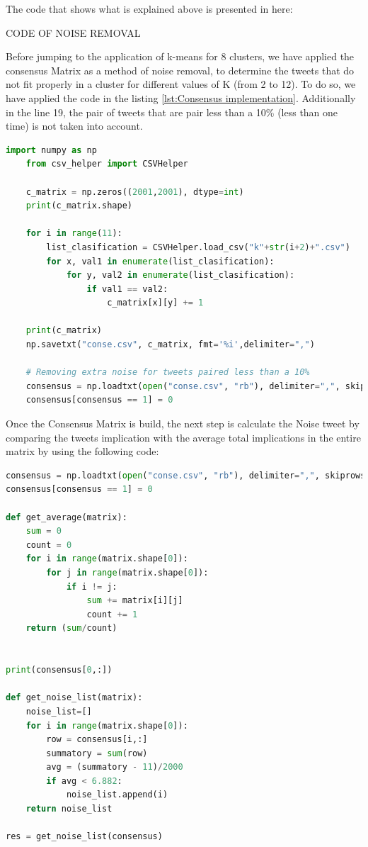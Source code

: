 \documentclass{article}
\begin{document}
The code that shows what is explained above is presented in here: 

CODE OF NOISE REMOVAL

Before jumping to the application of k-means for 8 clusters, we have applied the consensus Matrix as a method of noise removal, to determine the tweets that do not fit properly in a cluster for different
values of K (from 2 to 12). To do so, we have applied the code in the listing \ref{lst:Consensus implementation}. Additionally in the line 19, the pair of tweets that are pair less than a 10\% (less than one time) is not taken into account.
\begin{lstlisting}[language=Python, caption= Consensus Algorithm, label={lst:Consensus implementation}]
    import numpy as np
    from csv_helper import CSVHelper
    
    c_matrix = np.zeros((2001,2001), dtype=int)
    print(c_matrix.shape)
    
    for i in range(11):
        list_clasification = CSVHelper.load_csv("k"+str(i+2)+".csv")
        for x, val1 in enumerate(list_clasification):
            for y, val2 in enumerate(list_clasification):
                if val1 == val2:
                    c_matrix[x][y] += 1
    
    print(c_matrix)
    np.savetxt("conse.csv", c_matrix, fmt='%i',delimiter=",")

    # Removing extra noise for tweets paired less than a 10%
    consensus = np.loadtxt(open("conse.csv", "rb"), delimiter=",", skiprows=0)
    consensus[consensus == 1] = 0
\end{lstlisting}

Once the Consensus Matrix is build, the next step is calculate the Noise tweet by comparing the tweets implication with the average total implications in the entire matrix by using the following code:

\begin{lstlisting}[language=Python, caption= Consensus Noise, label={lst:Consensus_Noise}]
consensus = np.loadtxt(open("conse.csv", "rb"), delimiter=",", skiprows=0)
consensus[consensus == 1] = 0

def get_average(matrix):
    sum = 0
    count = 0
    for i in range(matrix.shape[0]):
        for j in range(matrix.shape[0]):
            if i != j:
                sum += matrix[i][j]
                count += 1
    return (sum/count)
            

print(consensus[0,:])

def get_noise_list(matrix):
    noise_list=[]
    for i in range(matrix.shape[0]):
        row = consensus[i,:]
        summatory = sum(row)
        avg = (summatory - 11)/2000
        if avg < 6.882:
            noise_list.append(i)
    return noise_list

res = get_noise_list(consensus)
\end{lstlisting}
\end{document}
